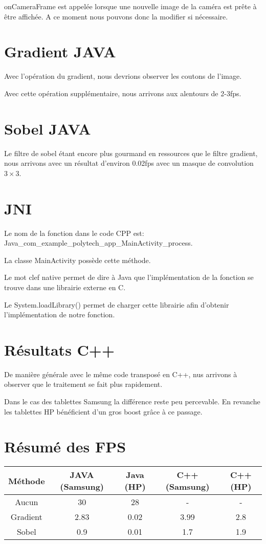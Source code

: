 \documentclass{report}
\begin{document}
				onCameraFrame est appelée lorsque une nouvelle image de la caméra est prête à être affichée.
				A ce moment nous pouvons donc la modifier si nécessaire.
		\section{Gradient JAVA}
			Avec l'opération du gradient, nous devrions observer les coutons de l'image.
			
			Avec cette opération supplémentaire, nous arrivons aux alentours de 2-3fps.
			
		\section{Sobel JAVA}
			Le filtre de sobel étant encore plus gourmand en ressources que le filtre gradient, nous arrivons avec un résultat d'environ 0.02fps avec un masque de convolution $3\times 3$.
		
		\section{JNI}
			Le nom de la fonction dans le code CPP est: Java\_com\_example\_polytech\_app\_MainActivity\_process.
			
			La classe MainActivity possède cette méthode.
			
			Le mot clef native permet de dire à Java que l'implémentation de la fonction se trouve dans une librairie externe en C.
			
			Le System.loadLibrary() permet de charger cette librairie afin d'obtenir l'implémentation de notre fonction.
			
		\section{Résultats C++}
			De manière générale avec le même code transposé en C++, nus arrivons à observer que le traitement se fait plus rapidement.
			
			Dans le cas des tablettes Samsung la différence reste peu percevable.
			En revanche les tablettes HP bénéficient d'un gros boost grâce à ce passage.
			
		\section{Résumé des FPS}
			\begin{tabular}{|c|c|c|c|c|}
				\hline
				Méthode & JAVA (Samsung) & Java (HP) & C++ (Samsung) & C++ (HP)\\\hline
				Aucun & 30 & 28 & - & -\\\hline
				Gradient & 2.83 & 0.02 & 3.99 & 2.8\\\hline
				Sobel & 0.9 & 0.01 & 1.7 & 1.9\\\hline
			\end{tabular}
\end{document}
